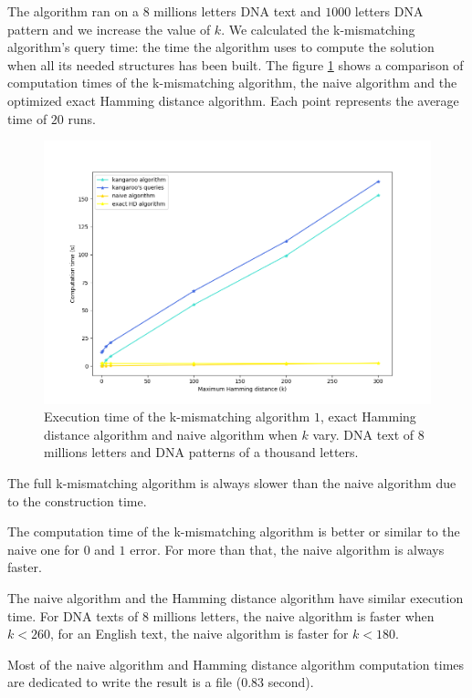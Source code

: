 \documentclass[preprint,12pt]{elsarticle}
\begin{document}
The algorithm ran on a $8$ millions letters DNA text and $1 000$ letters DNA pattern
and we increase the value of $k$.
We calculated the k-mismatching algorithm's query time:
the time the algorithm uses to compute the solution when all its needed structures has been built.
The figure \ref{Kang} shows a comparison of computation times of
the k-mismatching algorithm, the naive algorithm and the optimized exact Hamming distance algorithm.
Each point represents the average time of $20$ runs.

\begin{figure}[h]
\includegraphics[scale=0.6]{./figures/Kang.png}
\caption{
Execution time of the k-mismatching algorithm $1$, exact Hamming distance algorithm and naive algorithm
when $k$ vary.
DNA text of $8$ millions letters and DNA patterns of a thousand letters.
}
\label{Kang}
\end{figure}


The full k-mismatching algorithm is always slower than the naive algorithm due to the construction time.

The computation time of the k-mismatching algorithm is better or similar to the naive one for $0$ and $1$ error.
For more than that, the naive algorithm is always faster.

The naive algorithm and the Hamming distance algorithm have similar execution time.
For DNA texts of $8$ millions letters, the naive algorithm is faster when $k < 260$,
for an English text, the naive algorithm is faster for $k < 180$. 

Most of the naive algorithm and Hamming distance algorithm computation times
are dedicated to write the result is a file ($0.83$ second).
\end{document}

